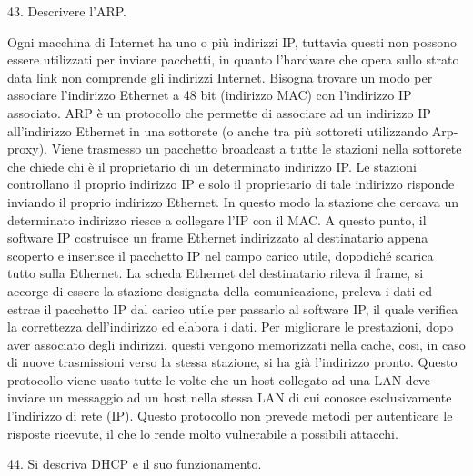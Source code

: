 43.	Descrivere l’ARP.

Ogni macchina di Internet ha uno o più indirizzi IP, tuttavia questi non possono essere utilizzati per inviare pacchetti, in quanto l’hardware che opera sullo strato data link non comprende gli indirizzi Internet.
Bisogna trovare un modo per associare l’indirizzo Ethernet a 48 bit (indirizzo MAC) con l’indirizzo IP associato.
ARP è un protocollo che permette di associare ad un indirizzo IP all’indirizzo Ethernet in una sottorete (o anche tra più sottoreti utilizzando Arp-proxy).
Viene trasmesso un pacchetto broadcast a tutte le stazioni nella sottorete che chiede chi è il proprietario di un determinato indirizzo IP. Le stazioni controllano il proprio indirizzo IP e solo il proprietario di tale indirizzo risponde inviando il proprio indirizzo Ethernet. In questo modo la stazione che cercava un determinato indirizzo riesce a collegare l’IP con il MAC.
A questo punto, il software IP costruisce un frame Ethernet indirizzato al destinatario appena scoperto e inserisce il pacchetto IP nel campo carico utile, dopodiché scarica tutto sulla Ethernet. 
La scheda Ethernet del destinatario rileva il frame, si accorge di essere la stazione designata della comunicazione, preleva i dati ed estrae il pacchetto IP dal carico utile per passarlo al software IP, il quale verifica la correttezza dell’indirizzo ed elabora i dati.
Per migliorare le prestazioni, dopo aver associato degli indirizzi, questi vengono memorizzati nella cache, cosi, in caso di nuove trasmissioni verso la stessa stazione, si ha già l’indirizzo pronto.
Questo protocollo viene usato tutte le volte che un host collegato ad una LAN deve inviare un messaggio ad un host nella stessa LAN di cui conosce esclusivamente l’indirizzo di rete (IP).
Questo protocollo non prevede metodi per autenticare le risposte ricevute, il che lo rende molto vulnerabile a possibili attacchi.
 
44.	Si descriva DHCP e il suo funzionamento.

